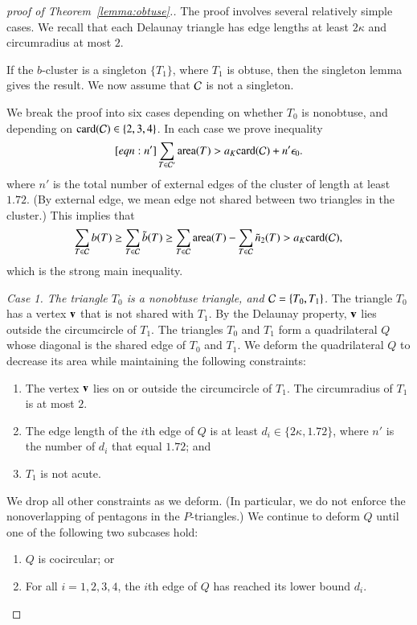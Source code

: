 \begin{proof}[proof of Theorem~\ref{lemma:obtuse}.]
  The proof involves several relatively simple cases.  
  We recall that each Delaunay triangle has edge lengths at
  least $2\kappa$ and circumradius at most $2$.

  If the $b$-cluster is a singleton $\{T_1\}$, where $T_1$ is obtuse,
  then the singleton lemma gives the result.
  We now assume that $\mathcal C$ is not a singleton.


We break the proof into six cases depending on whether $T_0$ is
nonobtuse, and depending on ${\operatorname{card}}(\mathcal C)\in \{2,3,4\}$.
In each case we prove inequality 
\begin{equation}\libel{eqn:n'}
\sum_{T\in \C'} \area(T) > a_K \card(\C) + n'\epso.
\end{equation}
where $n'$ is the total number of external edges of the cluster of length at least $1.72$.
(By external edge, we mean edge not shared between two triangles in the cluster.)
This implies that
\[
\sum_{T\in\mathcal C} b(T) \ge \sum_{T\in\mathcal C} \tilde b(T) \ge \sum_{T\in\mathcal C}{\operatorname{area}}(T) - \sum_{T\in\mathcal C} \tilde n_2(T) > a_K {\operatorname{card}}(\mathcal C),
\]
which is the strong main inequality.

{\it Case 1. The triangle $T_0$ is a nonobtuse triangle, and
  $\mathcal C=\{T_0,T_1\}$.}  The triangle $T_0$ has a vertex ${\mathbf v}$ that is
not shared with $T_1$.  By the Delaunay property, ${\mathbf v}$ lies outside
the circumcircle of $T_1$.  The triangles $T_0$ and $T_1$ form a
quadrilateral $Q$ whose diagonal is the shared edge of $T_0$ and
$T_1$.  We deform the quadrilateral $Q$ to decrease its area while
maintaining the following constraints:
\begin{enumerate}
\item The vertex ${\mathbf v}$ lies on or outside the circumcircle of
  $T_1$. The circumradius of $T_1$ is at most $2$.
\item The edge length of the $i$th edge of $Q$ is at least
  $d_i\in\{2\kappa,1.72\}$,
where $n'$ is the number of $d_i$ that equal $1.72$; and
\item $T_1$ is not acute.
\end{enumerate}
We drop all other constraints as we deform. (In particular, we do not
enforce the nonoverlapping of pentagons in the $P$-triangles.)
We continue to deform $Q$ until one of the following two subcases hold:
\begin{enumerate}
\item $Q$ is cocircular; or
\item For all $i=1,2,3,4$, the $i$th edge of $Q$ has reached its lower
  bound $d_i$.
\end{enumerate}


\end{proof}
